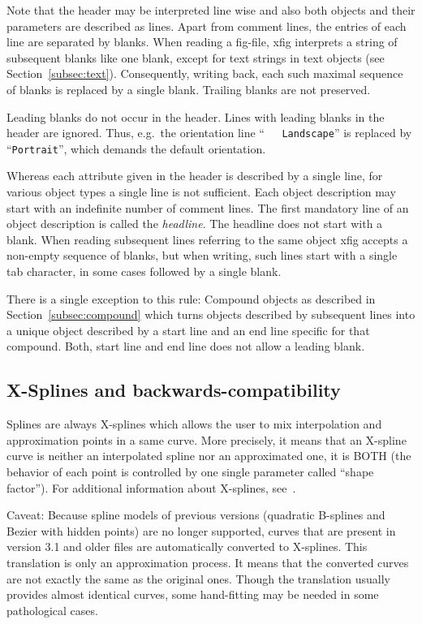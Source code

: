 \documentclass[10pt, a4paper]{article}
\begin{document}
Note that the header may be interpreted line wise 
and also both objects and their parameters are described as lines. 
Apart from comment lines, the entries of each line are separated by blanks. 
When reading a fig-file, 
xfig interprets a string of subsequent blanks like one blank, 
except for text strings in text objects (see Section~\ref{subsec:text}). 
Consequently, writing back, each such maximal sequence of blanks 
is replaced by a single blank. 
Trailing blanks are not preserved. 

Leading blanks do not occur in the header. 
Lines with leading blanks in the header are ignored. 
Thus, e.g.~the orientation line 
``\texttt{\ \ \ Landscape}'' is replaced by ``\texttt{Portrait}'', 
which demands the default orientation. 

Whereas each attribute given in the header is described by a single line, 
for various object types a single line is not sufficient. 
Each object description may start with an indefinite number of comment lines. 
The first mandatory line of an object description is called the {\em headline}. 
The headline does not start with a blank. 
When reading subsequent lines referring to the same object 
xfig accepts a non-empty sequence of blanks, 
but when writing, such lines start with a single tab character, 
in some cases followed by a single blank. 

There is a single exception to this rule: 
Compound objects as described in Section~\ref{subsec:compound} 
which turns objects described by subsequent lines 
into a unique object described by a 
start line and an end line specific for that compound. 
Both, start line and end line does not allow a leading blank. 


\subsection{X-Splines and backwards-compatibility}

Splines are always X-splines 
which allows the user to mix interpolation and approximation 
points in a same curve. 
More precisely, it means that an X-spline curve 
is neither an interpolated spline nor an approximated one, 
it is BOTH (the behavior of each point 
is controlled by one single parameter called ``shape factor''). 
For additional information about X-splines, see~\cite{XSpline}. 

Caveat: Because spline models of previous versions 
(quadratic B-splines and Bezier with hidden points) 
are no longer supported, 
curves that are present in version 3.1 and older files 
are automatically converted to X-splines. 
This translation is only an approximation process. 
It means that the converted curves 
are not exactly the same as the original ones. 
Though the translation usually provides almost identical curves, 
some hand-fitting may be needed in some pathological cases. 
\end{document}

